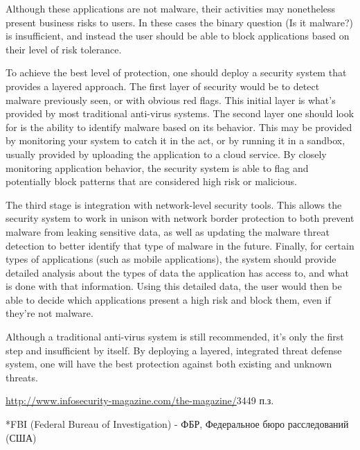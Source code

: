 \documentclass[a4paper]{article}
\begin{document}
Although these applications are not malware, their activities may nonetheless
present business risks to users. In these cases the binary question (Is it
malware?) is insufficient, and instead the user should be able to block
applications based on their level of risk tolerance.

To achieve the best level of protection, one should deploy a security system
that provides a layered approach. The first layer of security would be to detect
malware previously seen, or with obvious red flags. This initial layer is what's
provided by most traditional anti-virus systems. The second layer one should
look for is the ability to identify malware based on its behavior. This may be
provided by monitoring your system to catch it in the act, or by running it in a
sandbox, usually provided by uploading the application to a cloud service. By
closely monitoring application behavior, the security system is able to flag and
potentially block patterns that are considered high risk or malicious.

The third stage is integration with network-level security tools. This allows
the security system to work in unison with network border protection to both
prevent malware from leaking sensitive data, as well as updating the malware
threat detection to better identify that type of malware in the future. Finally,
for certain types of applications (such as mobile applications), the system
should provide detailed analysis about the types of data the application has
access to, and what is done with that information. Using this detailed data, the
user would then be able to decide which applications present a high risk and
block them, even if they're not malware.

Although a traditional anti-virus system is still recommended, it's only the
first step and insufficient by itself. By deploying a layered, integrated threat
defense system, one will have the best protection against both existing and
unknown threats.

\noindent
\uline{http://www.infosecurity-magazine.com/the-magazine/}\hspace{3cm}3449 п.з.

\noindent
*FBI (Federal Bureau of Investigation) - ФБР, Федеральное бюро расследований
(США)
\end{document}

